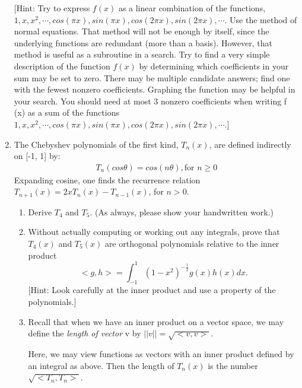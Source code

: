 \documentclass[conference,onecolumn]{IEEEtran}
\begin{document}
\begin{enumerate}[label=\arabic{enumi}.]
                  [Hint: Try to express $f (x)$ as a linear combination of the functions, $1, x, x^2, \cdots , cos(\pi x), sin(\pi x), cos(2\pi x), sin(2\pi x), \cdots$.
                        Use the method of normal equations.
                        That method will not be enough by itself, since the underlying functions are redundant (more than a basis).
                        However, that method is useful as a subroutine in a search.
                        Try to find a very simple description of the function $f (x)$ by determining which coefficients in your sum may be
                        set to zero.
                        There may be multiple candidate answers; find one with the fewest nonzero coefficients.
                        Graphing the function may be helpful in your search.
                        You should need at most 3 nonzero coefficients when writing f (x) as a sum of the functions $1, x, x^2, \cdots , cos(\pi x), sin(\pi x), cos(2\pi x), sin(2\pi x), \cdots$.]

            \clearpage
      \item The Chebyshev polynomials of the first kind, $T_n(x)$, are defined indirectly on [-1, 1] by:
            \begin{align*}
                  T_n(cos \theta) = cos(n \theta), \text{for } n \geq 0
            \end{align*}
            Expanding cosine, one finds the recurrence relation $T_{n+1}(x) = 2xT_n(x)-T_{n-1}(x)$, for $n > 0$.
            \begin{enumerate}
                  \item Derive $T_4$ and $T_5$. (As always, please show your handwritten work.)
                  \item Without actually computing or working out any integrals, prove that $T_4(x)$ and $T_5(x)$ are orthogonal polynomials relative to the inner product
                        $$
                              < g, h > = \int_{-1}^{1} (1 - x^2)^{-\frac{1}{2}}g(x)h(x)dx.
                        $$
                        [Hint: Look carefully at the inner product and use a property of the polynomials.]
                  \item Recall that when we have an inner product on a vector space, we may define the \textit{length of vector} v by $||v|| = \sqrt{< v, v >}$.

                        Here, we may view functions as vectors with an inner product defined by an integral
                        as above.
                        Then the length of $T_n(x)$ is the number $\sqrt{< T_n, T_n >}$.


\end{enumerate}
\end{enumerate}
\end{document}
